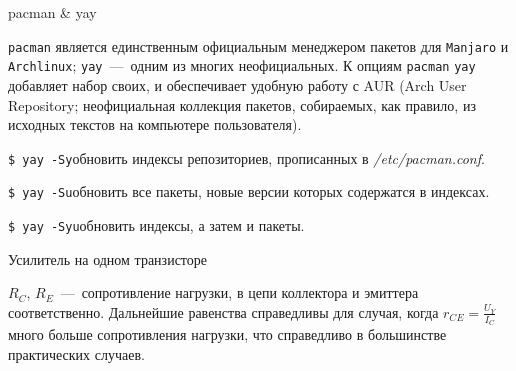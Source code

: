 \documentclass[
a4paper
,11pt
,landscape
,russian
,twocolumn
]{letter}
\newcommand\hsp{\hspace{.2in}}
\newcommand\vsp{\vspace{.2in}}
\begin{document}
\thispagestyle{empty}

\begin{Large}
    pacman \& yay
\end{Large}

\texttt{pacman} является единственным официальным менеджером пакетов для
\texttt{Manjaro} и \texttt{Archlinux}; \texttt{yay}~---~одним из многих
неофициальных.
К опциям \texttt{pacman} \texttt{yay} добавляет набор своих, и обеспечивает
удобную работу с AUR (Arch User Repository; неофициальная коллекция пакетов,
собираемых, как правило, из исходных текстов на компьютере пользователя).

\texttt{\$ yay -Sy}\hsp обновить индексы репозиториев, прописанных в
\textit{/etc/pacman.conf}.

\texttt{\$ yay -Su}\hsp обновить все пакеты, новые версии которых
содержатся в индексах.

\texttt{\$ yay -Syu}\hsp обновить индексы, а затем и пакеты.

\vsp

\begin{Large}
Усилитель на одном транзисторе
\end{Large}

\vsp

$R_C$, $R_E$~---~сопротивление нагрузки, в цепи коллектора и
эмиттера соответственно. Дальнейшие равенства справедливы для
случая, когда $r_{CE}=\frac{U_Y}{I_C}$ много больше сопротивления
нагрузки, что справедливо в большинстве практических случаев.
\end{document}

